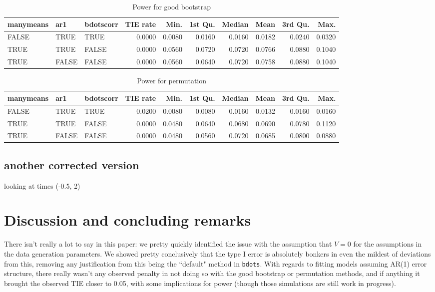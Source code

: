 \documentclass{article}
\newcommand{\xt}{\texttt}
\begin{document}
\begin{table}[H]
\centering
\begin{tabular}{lllrrrrrrr}
  \hline
manymeans & ar1 & bdotscorr & TIE rate & Min. & 1st Qu. & Median & Mean & 3rd Qu. & Max. \\ 
  \hline
FALSE & TRUE & TRUE & 0.0000 & 0.0080 & 0.0160 & 0.0160 & 0.0182 & 0.0240 & 0.0320 \\ 
  TRUE & TRUE & FALSE & 0.0000 & 0.0560 & 0.0720 & 0.0720 & 0.0766 & 0.0880 & 0.1040 \\ 
  TRUE & FALSE & FALSE & 0.0000 & 0.0560 & 0.0640 & 0.0720 & 0.0758 & 0.0880 & 0.1040 \\ 
   \hline
\end{tabular}
\caption{Power for good bootstrap} 
\label{tab:good_boot_pwr2}
\end{table}

\begin{table}[H]
\centering
\begin{tabular}{lllrrrrrrr}
  \hline
manymeans & ar1 & bdotscorr & TIE rate & Min. & 1st Qu. & Median & Mean & 3rd Qu. & Max. \\ 
  \hline
FALSE & TRUE & TRUE & 0.0200 & 0.0080 & 0.0080 & 0.0160 & 0.0132 & 0.0160 & 0.0160 \\ 
  TRUE & TRUE & FALSE & 0.0000 & 0.0480 & 0.0640 & 0.0680 & 0.0690 & 0.0780 & 0.1120 \\ 
  TRUE & FALSE & FALSE & 0.0000 & 0.0480 & 0.0560 & 0.0720 & 0.0685 & 0.0800 & 0.0880 \\ 
   \hline
\end{tabular}
\caption{Power for permutation} 
\label{tab:perm_pwr2}
\end{table}


\subsection{another corrected version}

looking at times (-0.5, 2)

\section{Discussion and concluding remarks}

There isn't really a lot to say in this paper: we pretty quickly identified the issue with the assumption that $V = 0$ for the assumptions in the data generation parameters. We showed pretty conclusively that the type I error is absolutely bonkers in even the mildest of deviations from this, removing any justification from this being the ``default" method in \xt{bdots}. With regards to fitting models assuming AR(1) error structure, there really wasn't any observed penalty in not doing so with the good bootstrap or permutation methods, and if anything it brought the observed TIE closer to 0.05, with some implications for power (though those simulations are still work in progress).
\end{document}
